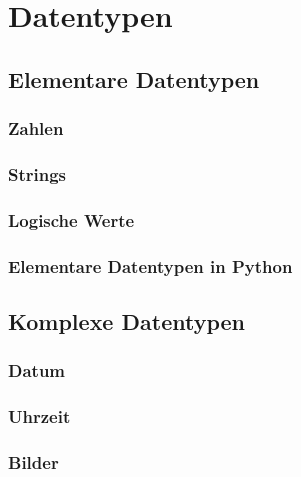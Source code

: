 \documentclass[
  oneside]{book}
\begin{document}
\hypertarget{datentypen-1}{%
\section{Datentypen}\label{datentypen-1}}

\hypertarget{elementare-datentypen-1}{%
\subsection{Elementare Datentypen}\label{elementare-datentypen-1}}

\hypertarget{zahlen-1}{%
\subsubsection{Zahlen}\label{zahlen-1}}

\hypertarget{strings}{%
\subsubsection{Strings}\label{strings}}

\hypertarget{logische-werte}{%
\subsubsection{Logische Werte}\label{logische-werte}}

\hypertarget{elementare-datentypen-in-python}{%
\subsubsection{Elementare Datentypen in Python}\label{elementare-datentypen-in-python}}

\hypertarget{komplexe-datentypen}{%
\subsection{Komplexe Datentypen}\label{komplexe-datentypen}}

\hypertarget{datum}{%
\subsubsection{Datum}\label{datum}}

\hypertarget{uhrzeit}{%
\subsubsection{Uhrzeit}\label{uhrzeit}}

\hypertarget{bilder}{%
\subsubsection{Bilder}\label{bilder}}
\end{document}
